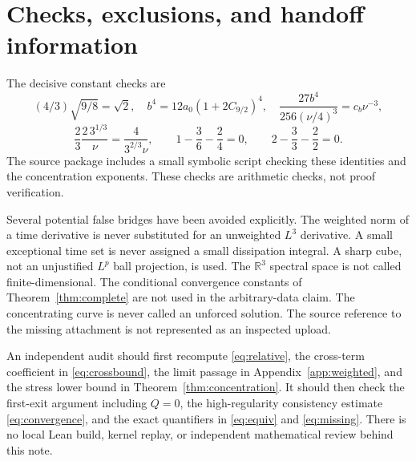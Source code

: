 \documentclass[11pt,a4paper]{article}
\theoremstyle{definition}\newtheorem{definition}[theorem]{Definition}
\theoremstyle{remark}\newtheorem{remark}[theorem]{Remark}
\newcommand{\R}{\mathbb R}
\newcommand{\cb}{c_b}
\numberwithin{equation}{section}
\begin{document}
\section{Checks, exclusions, and handoff information}
\label{app:checks}
The decisive constant checks are
\[
 (4/3)\sqrt{9/8}=\sqrt2,\quad
 b^4=12a_0(1+2C_{9/2})^4,\quad
 \frac{27b^4}{256(\nu/4)^3}=\cb\nu^{-3},
\]
\[
 \frac23\frac{2\,3^{1/3}}\nu=\frac4{3^{2/3}\nu},\qquad
 1-\frac36-\frac24=0,\qquad 2-\frac33-\frac22=0.
\]
The source package includes a small symbolic script checking these identities and the concentration exponents. These checks are arithmetic checks, not proof verification.

Several potential false bridges have been avoided explicitly. The weighted norm of a time derivative is never substituted for an unweighted $L^3$ derivative. A small exceptional time set is never assigned a small dissipation integral. A sharp cube, not an unjustified $L^p$ ball projection, is used. The $\R^3$ spectral space is not called finite-dimensional. The conditional convergence constants of Theorem~\ref{thm:complete} are not used in the arbitrary-data claim. The concentrating curve is never called an unforced solution. The source reference to the missing attachment is not represented as an inspected upload.

An independent audit should first recompute \eqref{eq:relative}, the cross-term coefficient in \eqref{eq:crossbound}, the limit passage in Appendix~\ref{app:weighted}, and the stress lower bound in Theorem~\ref{thm:concentration}. It should then check the first-exit argument including $Q=0$, the high-regularity consistency estimate \eqref{eq:convergence}, and the exact quantifiers in \eqref{eq:equiv} and \eqref{eq:missing}. There is no local Lean build, kernel replay, or independent mathematical review behind this note.
\end{document}
